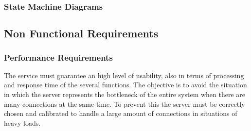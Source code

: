 \documentclass[a4paper,11pt]{report} %
\begin{document}
%	
%
	
	

	
	
	\pagebreak
	
	\subsubsection{State Machine Diagrams} 
	
	\pagebreak
		
	\subsection{Non Functional Requirements}
	
	\subsubsection{Performance Requirements} The service must guarantee an high level of usability, also in terms of processing and response time of the several functions. The objective is to avoid the situation in which the server represents the bottleneck of the entire system when there are many connections at the same time. To prevent this the server must be correctly chosen and calibrated to handle a large amount of connections in situations of heavy loads. 
	
\end{document}
